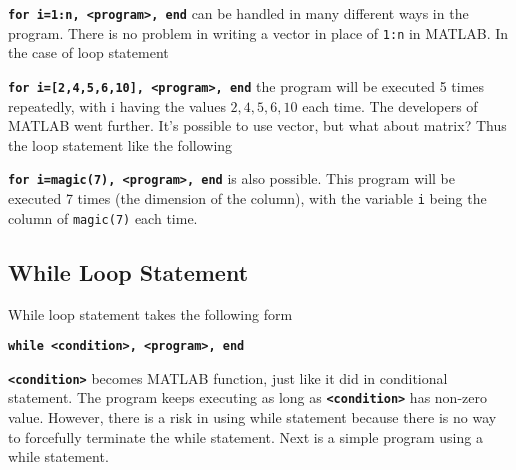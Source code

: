 \vv \texttt{\textbf{for i=1:n, <program>, end}} \vn can be handled in many different ways in the program. There is no problem in writing a vector in place of {\tt 1:n} in MATLAB. In the case of loop statement

\vv \texttt{\textbf{for i=[2,4,5,6,10], <program>, end}} \vn the program will be executed 5 times repeatedly, with i having the values $2,4,5,6,10$ each time. The developers of MATLAB went further. It's possible to use vector, but what about matrix? Thus the loop statement like the following

\vv \texttt{\textbf{for i=magic(7), <program>, end}} \vn is also possible. This program will be executed 7 times (the dimension of the column), with the variable {\tt i} being the column of {\tt magic(7)} each time.

\subsection {While Loop Statement}
While loop statement takes the following form

\vv \texttt{\textbf{while <condition>, <program>, end}}

\vn \texttt{\textbf{<condition>}} becomes MATLAB function, just like it did in conditional statement. The program keeps executing as long as \texttt{\textbf{<condition>}} has non-zero value. However, there is a risk in using while statement because there is no way to forcefully terminate the while statement. Next is a simple program using a while statement. \vv
\begin{center}
\end{center}

